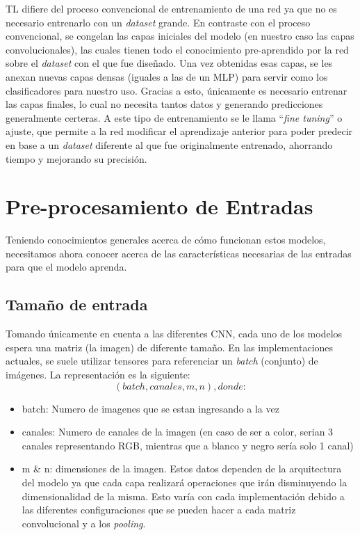 TL difiere del proceso convencional de entrenamiento de una red ya que no es necesario 
entrenarlo con un \textit{dataset} grande. En contraste con el proceso convencional, se congelan las 
capas iniciales del modelo (en nuestro caso las capas convolucionales), las cuales tienen todo el 
conocimiento pre-aprendido por la red sobre el \textit{dataset} con el que fue diseñado. Una vez 
obtenidas esas capas, se les anexan nuevas capas densas (iguales a las de un MLP) para servir como 
los clasificadores para nuestro uso. Gracias a esto, únicamente es necesario entrenar las capas finales, 
lo cual no necesita tantos datos y generando predicciones generalmente certeras. A este tipo de 
entrenamiento se le llama ``\textit{fine tuning}'' o ajuste, que permite a la red modificar el aprendizaje 
anterior para poder predecir en base a un \textit{dataset} diferente al que fue originalmente entrenado, 
ahorrando tiempo y mejorando su precisión.

\section{Pre-procesamiento de Entradas}
Teniendo conocimientos generales acerca de cómo funcionan estos modelos, necesitamos ahora conocer acerca 
de las características necesarias de las entradas para que el modelo aprenda.

\subsection{Tamaño de entrada}
Tomando únicamente en cuenta a las diferentes CNN, cada uno de los modelos espera una matriz (la imagen) de diferente tamaño. En las implementaciones actuales, se suele utilizar tensores para referenciar un \textit{batch} (conjunto) de imágenes. La representación es la siguiente:
$$(batch,canales, m,n), donde:$$
\begin{itemize}
    \item batch: Numero de imagenes que se estan ingresando a la vez
    \item canales: Numero de canales de la imagen (en caso de ser a color, serian 3 canales representando RGB, mientras que a blanco y negro sería solo 1 canal)
    \item m \& n: dimensiones de la imagen. Estos datos dependen de la arquitectura del modelo ya 
    que cada capa realizará operaciones que irán disminuyendo la dimensionalidad 
    de la misma. Esto varía con cada implementación debido a las diferentes configuraciones 
    que se pueden hacer a cada matriz convolucional y a los \textit{pooling}.
\end{itemize}

